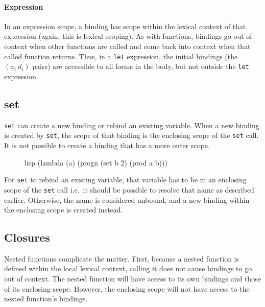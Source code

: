 \documentclass[a4paper, 12pt]{article}
\begin{document}
\paragraph{Expression}
In an expression scope, a binding has scope within the lexical context of that expression (again, this is lexical scoping). As with functions, bindings go out of context when other functions are called and come back into context when that called function returns. Thus, in a \texttt{let} expression, the initial bindings (the $(a_i\ d_i)$ pairs) are accessible to all forms in the body, but not outside the \texttt{let} expression.

\subsection{set}
\texttt{set} can create a new binding or rebind an existing variable. When a new binding is created by \texttt{set}, the scope of that binding is the enclosing scope of the \texttt{set} call. It is not possible to create a binding that has a more outer scope.

\begin{figure}[htp]
    \centering
    \begin{cminted}[autogobble=true, escapeinside=??]{lisp}
        (lambda (a) (progn (set b 2) (prod a b)))
    \end{cminted}
    \captionsetup[figure]{font=small}
\end{figure}

For \texttt{set} to rebind an existing variable, that variable has to be in an enclosing scope of the \texttt{set} call i.e.\ it should be possible to resolve that name as described earlier. Otherwise, the name is considered unbound, and a new binding within the enclosing scope is created instead.

\subsection{Closures}
Nested functions complicate the matter. First, because a nested function is defined within the local lexical context, calling it does not cause bindings to go out of context. The nested function will have access to its own bindings and those of its enclosing scope. However, the enclosing scope will not have access to the nested function's bindings.
\end{document}
